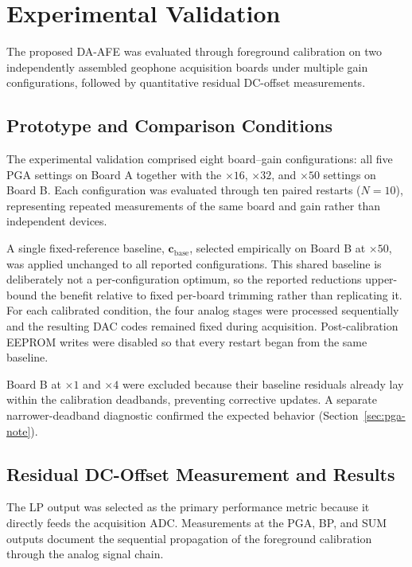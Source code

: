 \section{Experimental Validation}
\label{sec:experimental-validation}

The proposed DA-AFE was evaluated through foreground calibration on two independently assembled geophone acquisition boards under multiple gain configurations, followed by quantitative residual DC-offset measurements.

\subsection{Prototype and Comparison Conditions}

The experimental validation comprised eight board--gain configurations: all five PGA settings on Board A together with the $\times16$, $\times32$, and $\times50$ settings on Board B. Each configuration was evaluated through ten paired restarts ($N=10$), representing repeated measurements of the same board and gain rather than independent devices.

A single fixed-reference baseline, $\mathbf{c}_{\mathrm{base}}$, selected empirically on Board B at $\times50$, was applied unchanged to all reported configurations. This shared baseline is deliberately not a per-configuration optimum, so the reported reductions upper-bound the benefit relative to fixed per-board trimming rather than replicating it. For each calibrated condition, the four analog stages were processed sequentially and the resulting DAC codes remained fixed during acquisition. Post-calibration EEPROM writes were disabled so that every restart began from the same baseline.

Board B at $\times1$ and $\times4$ were excluded because their baseline residuals already lay within the calibration deadbands, preventing corrective updates. A separate narrower-deadband diagnostic confirmed the expected behavior (Section~\ref{sec:pga-note}).

\subsection{Residual DC-Offset Measurement and Results}

The LP output was selected as the primary performance metric because it directly feeds the acquisition ADC. Measurements at the PGA, BP, and SUM outputs document the sequential propagation of the foreground calibration through the analog signal chain.

